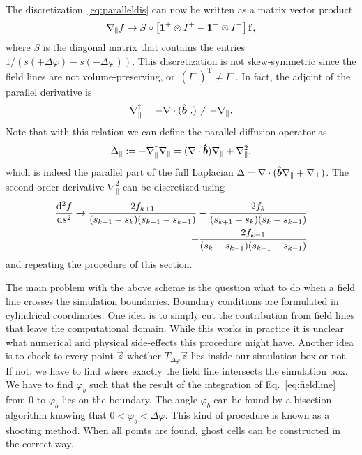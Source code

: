 The discretization~\eqref{eq:paralleldis} can now be written as a matrix vector product
\begin{align}
    \nabla_\parallel f \rightarrow S \circ \left[ \mathbf{1}^+\otimes I^+ - \mathbf{1}^- \otimes I^-  \right] {\mathbf{f}}, 
    \label{}
\end{align}
where $S$ is the diagonal matrix that contains the entries $1/(s(+\Delta\varphi) - s(-\Delta\varphi))$.
This discretization is not skew-symmetric since the
field lines are not volume-preserving, or~$(I^+)^\mathrm{T} \neq I^-$.
In fact, the adjoint of the parallel derivative is
\begin{align}
    \nabla_\parallel^\dagger = - \nabla\cdot(\bm{\hat{b}}\ . ) \neq -\nabla_\parallel.
    \label{}
\end{align}
Note that with this relation we can define the parallel 
diffusion operator as
\begin{align}
    \Delta_\parallel := -\nabla_\parallel^\dagger \nabla_\parallel = (\nabla\cdot \bm{\hat{b}}) \nabla_\parallel + \nabla_\parallel^2 , 
    \label{}
\end{align}
which is indeed the parallel part of the full Laplacian $\Delta = \nabla\cdot( \bm{\hat{b}} \nabla_\parallel + \nabla_\perp)$.
The second order derivative $\nabla_\parallel^2$ can be 
discretized using 
\begin{align}
    \frac{\mathrm{d}^2 f}{\mathrm{d} s^2} \rightarrow  
    \frac{2f_{k+1} }{(s_{k+1}-s_k)(s_{k+1}-s_{k-1})} -
    \frac{2f_k}{(s_{k+1}-s_k)(s_k - s_{k-1})} \nonumber\\ + 
    \frac{2f_{k-1} }{(s_{k}-s_{k-1})(s_{k+1}-s_{k-1})} 
    \label{}
\end{align}
and repeating the procedure of this section.

The main problem with the above scheme is the question what
 to do when a field line crosses the simulation boundaries. 
Boundary conditions are formulated in cylindrical coordinates. 
One idea is to simply cut the contribution from field lines
that leave the computational domain. While this works in practice
it is unclear what numerical and physical side-effects this procedure might have. 
Another idea is to check to every point $\vec z$ whether $T_{\Delta\varphi}\vec z$
lies inside our simulation box or not. If not, we have to find where exactly the 
field line intersects the simulation box.  We have to find
$\varphi_b$ such that the result of the integration of Eq.~\eqref{eq:fieldline} from 
$0$ to $\varphi_b$ lies on the boundary. 
The angle $\varphi_b$ can be found by a bisection algorithm knowing that $0<\varphi_b < \Delta\varphi$. 
This kind of procedure is known as a shooting method. 
When all points are found, ghost cells can be constructed in the correct way. 


